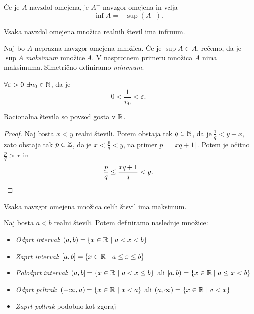 \documentclass[12pt, a4paper]{article}
\begin{document}
\begin{trditev}
Če je $A$ navzdol omejena, je $A^-$ navzgor omejena in velja
\[
\inf A=-\sup(A^-).
\]
\end{trditev}

\begin{posledica}
Vsaka navzdol omejena množica realnih števil ima infimum.
\end{posledica}

\begin{definicija}
Naj bo $A$ neprazna navzgor omejena množica. Če je $\sup A\in A$, rečemo, da je $\sup A$ \emph{maksimum} množice $A$. V nasprotnem primeru množica $A$ nima maksimuma. Simetrično definiramo \emph{minimum}.
\end{definicija}

\begin{posledica}
$\forall\varepsilon>0~\exists n_0\in\mathbb{N}$, da je
\[
0<\frac{1}{n_0}<\varepsilon.
\]
\end{posledica}

\begin{trditev}
Racionalna števila so povsod gosta v $\mathbb{R}$.
\end{trditev}

\begin{proof}
Naj bosta $x<y$ realni števili. Potem obstaja tak $q\in\mathbb{N}$, da je $\frac{1}{q}<y-x$, zato obstaja tak $p\in\mathbb{Z}$, da je $x<\frac{p}{q}<y$, na primer $p=\lfloor xq+1\rfloor$. Potem je očitno $\frac{p}{q}>x$ in
\[
\frac{p}{q}\leq \frac{xq+1}{q}<y.\qedhere
\]
\end{proof}

\begin{trditev}
Vsaka navzgor omejena množica celih števil ima maksimum.
\end{trditev}

\begin{definicija}
Naj bosta $a<b$ realni števili. Potem definiramo naslednje množice:

\begin{itemize}
\item \emph{Odprt interval}: $(a,b)=\left\{x\in\mathbb{R}~\middle\vert~a<x<b\right\}$
\item \emph{Zaprt interval}: $[a,b]=\left\{x\in\mathbb{R}~\middle\vert~a\leq x\leq b\right\}$
\item \emph{Polodprt interval}: $(a,b]=\left\{x\in\mathbb{R}~\middle\vert~a<x\leq b\right\}$ ali $[a,b)=\left\{x\in\mathbb{R}~\middle\vert~a\leq x<b\right\}$
\item \emph{Odprt poltrak}: $(-\infty, a)=\left\{x\in\mathbb{R}~\middle\vert~x<a\right\}$ ali $(a,\infty)=\left\{x\in\mathbb{R}~\middle\vert~a<x\right\}$
\item \emph{Zaprt poltrak} podobno kot zgoraj
\end{itemize}
\end{definicija}
\end{document}
